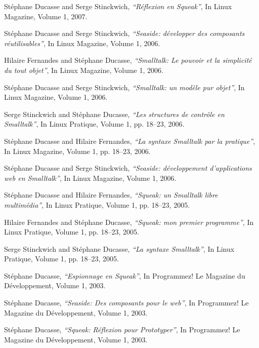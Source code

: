 \documentclass{article}
\newcommand{\czauthors}[1]{#1}
\newcommand{\cztitle}[1]{\emph{``#1''}}
\newcommand{\czjournal}[1]{#1}
\begin{document}
\begin{itemize}
	\pub  \czauthors{St\'ephane Ducasse and Serge Stinckwich},  \cztitle{R\'eflexion en Squeak},  In \czjournal{Linux Magazine}, Volume 1, 2007.

	\pub  \czauthors{St\'ephane Ducasse and Serge Stinckwich},  \cztitle{Seaside: d\'evelopper des composants r\'eutilisables},  In \czjournal{Linux Magazine}, Volume 1, 2006.

	\pub  \czauthors{Hilaire Fernandes and St\'ephane Ducasse},  \cztitle{Smalltalk: Le pouvoir et la simplicit\'e du tout objet},  In \czjournal{Linux Magazine}, Volume 1, 2006.

	\pub  \czauthors{St\'ephane Ducasse and Serge Stinckwich},  \cztitle{Smalltalk: un mod\`ele pur objet},  In \czjournal{Linux Magazine}, Volume 1, 2006.

	\pub  \czauthors{Serge Stinckwich and St\'ephane Ducasse},  \cztitle{Les structures de contr\^ole en Smalltalk},  In \czjournal{Linux Pratique}, Volume 1, pp. 18--23, 2006.

	\pub  \czauthors{St\'ephane Ducasse and Hilaire Fernandes},  \cztitle{La syntaxe Smalltalk par la pratique},  In \czjournal{Linux Magazine}, Volume 1, pp. 18--23, 2006.

	\pub  \czauthors{St\'ephane Ducasse and Serge Stinckwich},  \cztitle{Seaside: d\'eveloppement d'applications web en Smalltalk},  In \czjournal{Linux Magazine}, Volume 1, 2006.

	\pub  \czauthors{St\'ephane Ducasse and Hilaire Fernandes},  \cztitle{Squeak: un Smalltalk libre multim\'edia},  In \czjournal{Linux Pratique}, Volume 1, pp. 18--23, 2005.

	\pub  \czauthors{Hilaire Fernandes and St\'ephane Ducasse},  \cztitle{Squeak: mon premier programme},  In \czjournal{Linux Pratique}, Volume 1, pp. 18--23, 2005.

	\pub  \czauthors{Serge Stinckwich and St\'ephane Ducasse},  \cztitle{La syntaxe Smalltalk},  In \czjournal{Linux Pratique}, Volume 1, pp. 18--23, 2005.

	\pub  \czauthors{St\'ephane Ducasse},  \cztitle{Espionnage en Squeak},  In \czjournal{Programmez! Le Magazine du D\'eveloppement}, Volume 1, 2003.

	\pub  \czauthors{St\'ephane Ducasse},  \cztitle{Seaside: Des composants pour le web},  In \czjournal{Programmez! Le Magazine du D\'eveloppement}, Volume 1, 2003.

	\pub  \czauthors{St\'ephane Ducasse},  \cztitle{Squeak: R\'eflexion pour Prototyper},  In \czjournal{Programmez! Le Magazine du D\'eveloppement}, Volume 1, 2003.


\end{itemize}
\end{document}
